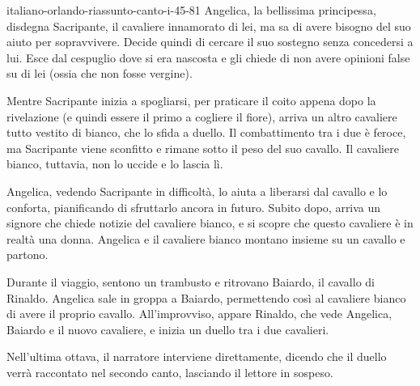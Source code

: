 \documentclass[preview]{standalone}
\begin{document}
\begin{snippet}{italiano-orlando-riassunto-canto-i-45-81}
    Angelica, la bellissima principessa, disdegna Sacripante, il cavaliere innamorato di lei,
    ma sa di avere bisogno del suo aiuto per sopravvivere.
    Decide quindi di cercare il suo sostegno senza concedersi a lui.
    Esce dal cespuglio dove si era nascosta e gli chiede di non avere opinioni false su di lei (ossia che non fosse vergine).

    Mentre Sacripante inizia a spogliarsi, per praticare il coito appena dopo la rivelazione (e quindi essere il primo a cogliere il fiore),
    arriva un altro cavaliere tutto vestito di bianco,
    che lo sfida a duello.
    Il combattimento tra i due è feroce, ma Sacripante viene sconfitto e rimane sotto il
    peso del suo cavallo. Il cavaliere bianco, tuttavia, non lo uccide e lo lascia lì.

    Angelica, vedendo Sacripante in difficoltà, lo aiuta a liberarsi dal cavallo e lo conforta,
    pianificando di sfruttarlo ancora in futuro.
    Subito dopo, arriva un signore che chiede notizie del cavaliere bianco,
    e si scopre che questo cavaliere è in realtà una donna.
    Angelica e il cavaliere bianco montano insieme su un cavallo e partono.

    Durante il viaggio, sentono un trambusto e ritrovano Baiardo, il cavallo di Rinaldo.
    Angelica sale in groppa a Baiardo, permettendo così al cavaliere bianco di
    avere il proprio cavallo. All'improvviso, appare Rinaldo, che vede Angelica,
    Baiardo e il nuovo cavaliere, e inizia un duello tra i due cavalieri.

    Nell'ultima ottava, il narratore interviene direttamente,
    dicendo che il duello verrà raccontato nel secondo canto,
    lasciando il lettore in sospeso.
\end{snippet}
\end{document}
